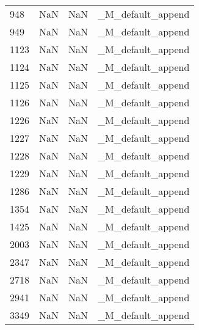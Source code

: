 \begin{tabular}{llll}
948  &                   NaN &                        NaN &                         \_M\_default\_append \\
949  &                   NaN &                        NaN &                         \_M\_default\_append \\
1123 &                   NaN &                        NaN &                         \_M\_default\_append \\
1124 &                   NaN &                        NaN &                         \_M\_default\_append \\
1125 &                   NaN &                        NaN &                         \_M\_default\_append \\
1126 &                   NaN &                        NaN &                         \_M\_default\_append \\
1226 &                   NaN &                        NaN &                         \_M\_default\_append \\
1227 &                   NaN &                        NaN &                         \_M\_default\_append \\
1228 &                   NaN &                        NaN &                         \_M\_default\_append \\
1229 &                   NaN &                        NaN &                         \_M\_default\_append \\
1286 &                   NaN &                        NaN &                         \_M\_default\_append \\
1354 &                   NaN &                        NaN &                         \_M\_default\_append \\
1425 &                   NaN &                        NaN &                         \_M\_default\_append \\
2003 &                   NaN &                        NaN &                         \_M\_default\_append \\
2347 &                   NaN &                        NaN &                         \_M\_default\_append \\
2718 &                   NaN &                        NaN &                         \_M\_default\_append \\
2941 &                   NaN &                        NaN &                         \_M\_default\_append \\
3349 &                   NaN &                        NaN &                         \_M\_default\_append \\

\end{tabular}
